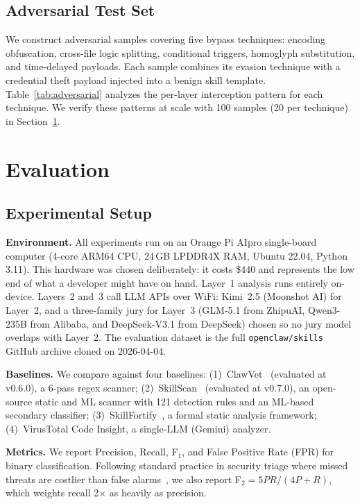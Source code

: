\documentclass[sigconf,nonacm]{acmart}
\begin{document}
\subsection{Adversarial Test Set}

We construct adversarial samples covering five bypass techniques: encoding obfuscation, cross-file logic splitting, conditional triggers, homoglyph substitution, and time-delayed payloads. Each sample combines its evasion technique with a credential theft payload injected into a benign skill template. Table~\ref{tab:adversarial} analyzes the per-layer interception pattern for each technique. We verify these patterns at scale with 100 samples (20 per technique) in Section~\ref{sec:eval}.

\section{Evaluation}
\label{sec:eval}

\subsection{Experimental Setup}

\textbf{Environment.} All experiments run on an Orange Pi AIpro single-board computer (4-core ARM64 CPU, 24\,GB LPDDR4X RAM, Ubuntu 22.04, Python 3.11). This hardware was chosen deliberately: it costs \$440 and represents the low end of what a developer might have on hand. Layer~1 analysis runs entirely on-device. Layers~2 and~3 call LLM APIs over WiFi: Kimi~2.5 (Moonshot AI) for Layer~2, and a three-family jury for Layer~3 (GLM-5.1 from ZhipuAI, Qwen3-235B from Alibaba, and DeepSeek-V3.1 from DeepSeek) chosen so no jury model overlaps with Layer~2. The evaluation dataset is the full \texttt{openclaw/skills} GitHub archive cloned on 2026-04-04.

\textbf{Baselines.} We compare against four baselines: (1)~ClawVet~\cite{clawvet2026} (evaluated at v0.6.0), a 6-pass regex scanner; (2)~SkillScan~\cite{skillscan2026} (evaluated at v0.7.0), an open-source static and ML scanner with 121 detection rules and an ML-based secondary classifier; (3)~SkillFortify~\cite{skillfortify2026}, a formal static analysis framework; (4)~VirusTotal Code Insight, a single-LLM (Gemini) analyzer.

\textbf{Metrics.} We report Precision, Recall, F$_1$, and False Positive Rate (FPR) for binary classification. Following standard practice in security triage where missed threats are costlier than false alarms~\cite{vanrijsbergen1979,elkan2001}, we also report F$_2 = 5PR/(4P+R)$, which weights recall 2$\times$ as heavily as precision.
\end{document}
